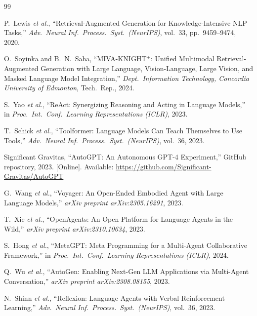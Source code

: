 \documentclass[10pt,conference]{IEEEtran}
\theoremstyle{ieeethm}
\theoremstyle{ieeedef}
\theoremstyle{ieeeremark}
\begin{document}
\balance

\begin{thebibliography}{99}

P.~Lewis \textit{et al.},
``Retrieval-Augmented Generation for Knowledge-Intensive NLP Tasks,''
\textit{Adv.\ Neural Inf.\ Process.\ Syst.\ (NeurIPS)}, vol.~33, pp.~9459--9474, 2020.

O.~Soyinka and B.~N.~Saha,
``MIVA-KNIGHT$^+$: Unified Multimodal Retrieval-Augmented Generation with Large Language, Vision-Language, Large Vision, and Masked Language Model Integration,''
\textit{Dept.\ Information Technology, Concordia University of Edmonton}, Tech.\ Rep., 2024.

S.~Yao \textit{et al.},
``ReAct: Synergizing Reasoning and Acting in Language Models,''
in \textit{Proc.\ Int.\ Conf.\ Learning Representations (ICLR)}, 2023.

T.~Schick \textit{et al.},
``Toolformer: Language Models Can Teach Themselves to Use Tools,''
\textit{Adv.\ Neural Inf.\ Process.\ Syst.\ (NeurIPS)}, vol.~36, 2023.

Significant Gravitas,
``AutoGPT: An Autonomous GPT-4 Experiment,''
GitHub repository, 2023. [Online]. Available: \url{https://github.com/Significant-Gravitas/AutoGPT}

G.~Wang \textit{et al.},
``Voyager: An Open-Ended Embodied Agent with Large Language Models,''
\textit{arXiv preprint arXiv:2305.16291}, 2023.

T.~Xie \textit{et al.},
``OpenAgents: An Open Platform for Language Agents in the Wild,''
\textit{arXiv preprint arXiv:2310.10634}, 2023.

S.~Hong \textit{et al.},
``MetaGPT: Meta Programming for a Multi-Agent Collaborative Framework,''
in \textit{Proc.\ Int.\ Conf.\ Learning Representations (ICLR)}, 2024.

Q.~Wu \textit{et al.},
``AutoGen: Enabling Next-Gen LLM Applications via Multi-Agent Conversation,''
\textit{arXiv preprint arXiv:2308.08155}, 2023.

N.~Shinn \textit{et al.},
``Reflexion: Language Agents with Verbal Reinforcement Learning,''
\textit{Adv.\ Neural Inf.\ Process.\ Syst.\ (NeurIPS)}, vol.~36, 2023.


\end{thebibliography}
\end{document}

